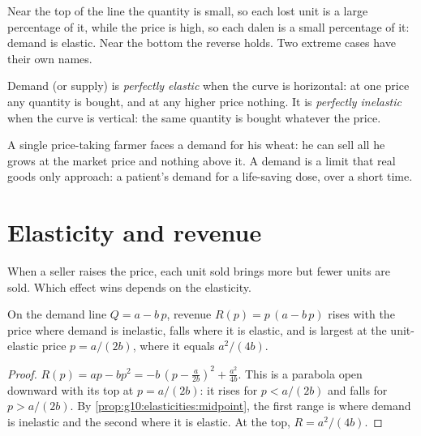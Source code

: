 Near the top of the line the quantity is small, so each lost unit is a large percentage of it, while the price is high, so each dalen is a
small percentage of it: demand is elastic. Near the bottom the reverse holds. Two extreme cases have their own names.

\begin{definition}\label{def:g10:elasticities:perfectly-elastic}
Demand (or supply) is \emph{perfectly elastic} when the curve is horizontal: at one price any quantity is bought,
and at any higher price nothing. It is \emph{perfectly inelastic} when the curve is vertical: the same quantity
is bought whatever the price.
\end{definition}
\label{def:g10:elasticities:perfectly-inelastic}

A single price-taking farmer faces a  demand for his wheat: he can sell all he grows at the market price and nothing above
it. A  demand is a limit that real goods only approach: a patient's demand for a life-saving dose, over a short time.

\section{Elasticity and revenue}\label{sec:g10:elasticities:revenue}

When a seller raises the price, each unit sold brings more but fewer units are sold. Which effect wins depends on the elasticity.

\begin{proposition}\label{prop:g10:elasticities:revenue}
On the demand line $Q = a - b\,p$, revenue $R(p) = p\,(a - b\,p)$ rises with the price where demand is inelastic, falls where it is elastic,
and is largest at the unit-elastic price $p = a/(2b)$, where it equals $a^2/(4b)$.
\end{proposition}
\begin{proof}
$R(p) = ap - bp^2 = -b\,(p - \tfrac{a}{2b})^2 + \tfrac{a^2}{4b}$. This is a parabola open downward with its top at $p = a/(2b)$: it rises for
$p < a/(2b)$ and falls for $p > a/(2b)$. By \cref{prop:g10:elasticities:midpoint}, the first range is where demand is inelastic and the second
where it is elastic. At the top, $R = a^2/(4b)$.
\end{proof}

